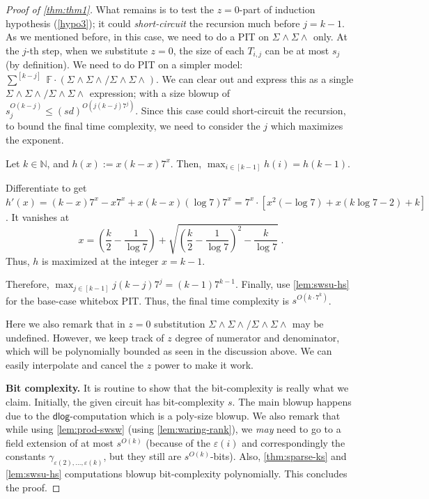 \documentclass[10pt,a4paper]{article}
\newcommand{\F}{\mathbb{F}}
\newcommand{\N}{\mathbb{N}}
\newcommand{\dlg}{\mathsf{dlog}}
\newcommand{\SWSU}[2]{\Sigma^{#1}\!\wedge\!\Sigma\!\wedge^{#2}}
\numberwithin{equation}{section}
\newenvironment{proof-sketch}{\medskip\noindent{\em Proof Sketch.}}{\qed\bigskip}
\begin{document}
\begin{proof}[Proof of \autoref{thm:thm1}]
What remains is to test the $z=0$-part of induction hypothesis (\ref{hypo3}); it could \emph{short-circuit} the recursion much before $j=k-1$. As we mentioned before, in this case, we need to do a PIT on $\SWSU{}{}{}$ only. At the $j$-th step, when we substitute $z=0$, the size of each $T_{i,j}$ can be at most $s_j$ (by definition). We need to do PIT on a simpler model: $\sum^{[k-j]}\;\F \cdot (\SWSU{}{}{}/\SWSU{}{}{})$. We can clear out and express this as a single $\SWSU{}{}{}/\SWSU{}{}{}$ expression; with a size blowup of $s_j^{O(k-j)} \le (sd)^{O(j(k-j)7^j)}$. Since this case could short-circuit the recursion, to bound the final time complexity, we need to consider the $j$ which maximizes the exponent.

\begin{lemma}\label{max-exp-opt}
    Let $k \in \N$, and $h(x):= x (k-x)7^x$. Then, $\max_{i \in [k-1]} h(i)=h(k-1)$.
\end{lemma}
\begin{proof-sketch}
    Differentiate to get $h'(x)= (k-x)7^x - x7^x +  x(k-x)(\log 7)7^x = 7^x\cdot[x^2(-\log7) + x(k\log7-2) + k ]$. It vanishes at \[x = \left(\frac{k}{2} - \frac{1}{\log 7}\right) + \sqrt{\left(\frac{k}{2} - \frac{1}{\log 7}\right)^2 - \frac{k}{\log 7}}\;.\]Thus, $h$ is maximized at the integer $x=k-1$.
\end{proof-sketch}


Therefore, $\max_{j \in [k-1]} j(k-j)7^j = (k-1)7^{k-1}$. 
%
Finally, use \autoref{lem:swsu-hs} for the base-case whitebox PIT. Thus, the final time complexity is $s^{O(k \cdot 7^k)}$. 

Here we also remark that in $z =0$ substitution $\SWSU{}{}/\SWSU{}{}$ may be undefined. However, we keep track of $z$ degree of numerator and denominator, which will be polynomially bounded as seen in the discussion above. We can easily interpolate and cancel the $z$ power to make it work. 

\smallskip
{\bf \noindent Bit complexity.} It is routine to show that the  bit-complexity is really what we claim. Initially, the given circuit has bit-complexity $s$. The main blowup happens due to the $\dlg$-computation which is a poly-size blowup. We also remark that while using \autoref{lem:prod-swsw} (using \autoref{lem:waring-rank}), we \emph{may} need to go to a field extension of at most $s^{O(k)}$ (because of the $\varepsilon(i)$ and correspondingly the constants $\gamma_{\varepsilon(2),\hdots,\varepsilon(k)}$, but they still are $s^{O(k)}$-bits). Also, \autoref{thm:sparse-ks} and \autoref{lem:swsu-hs} computations blowup bit-complexity polynomially. This concludes the proof.
\end{proof}
\end{document}
